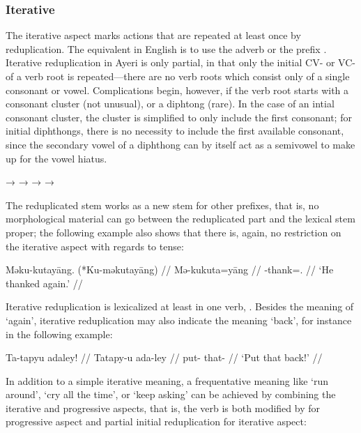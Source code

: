 \subsubsection{Iterative}

The iterative aspect marks actions that are repeated at least once by 
reduplication. The equivalent in English is to use the adverb  or the 
prefix . Iterative reduplication in Ayeri is only partial, in that only 
the initial CV- or VC- of a verb root is repeated---there are no verb roots 
which consist only of a single consonant or vowel. Complications begin, 
however, if the verb root starts with a consonant cluster (not unusual), or a 
diphtong (rare). In the case of an intial consonant cluster, the cluster is 
simplified to only include the first consonant; for initial diphthongs, there 
is no necessity to include the first available consonant, since the secondary 
vowel of a diphthong can by itself act as a semivowel to make up for the vowel 
hiatus.

\pex
	\a {}
		→ 
	\a {}
		→ 
	\a {}
		→ 
	\a {}
		→ 
\xe

The reduplicated stem works as a new stem for other prefixes, that is, no 
morphological material can go between the reduplicated part and the lexical 
stem proper; the following example also shows that there is, again, no 
restriction on the iterative aspect with regards to tense:

\ex\begingl
	\gla Məku-kutayāng. \quad \textup{(*}Ku-məkutayāng\textup{)} //
	\glb Mə-ku\til{}kuta=yāng //
	\glc \Pst{}-\Iter{}\til{}thank=\TsgM{}.\Aarg{} //
	\glft `He thanked again.' //
\endgl\xe

Iterative reduplication is lexicalized at least in one verb, 
. Besides the meaning of `again', iterative 
reduplication may also indicate the meaning `back', for instance in the 
following example:

\ex\begingl
	\gla Ta-tapyu adaley! //
	\glb Ta\til{}tapy-u ada-ley //
	\glc \Iter{}\til{}put-\Imp{} that-\PargI{} //
	\glft `Put that back!' //
\endgl\xe

In addition to a simple iterative meaning, a frequentative meaning like `run 
around', `cry all the time', or `keep asking' can be achieved by combining the 
iterative and progressive aspects, that is, the verb is both modified by 
 for progressive aspect and partial initial reduplication for 
iterative aspect:

